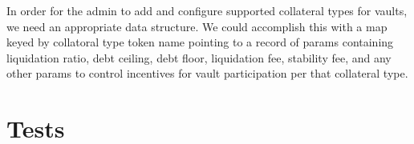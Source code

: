 \documentclass{article} %
\begin{document}
In order for the admin to add and configure supported collateral types for vaults,
we need an appropriate data structure. We could accomplish this with a map keyed by
collatoral type token name pointing to a record of params containing liquidation ratio,
debt ceiling, debt floor, liquidation fee, stability fee, and any other params to control
incentives for vault participation per that collateral type.

\section{Tests}


% 
\end{document}
